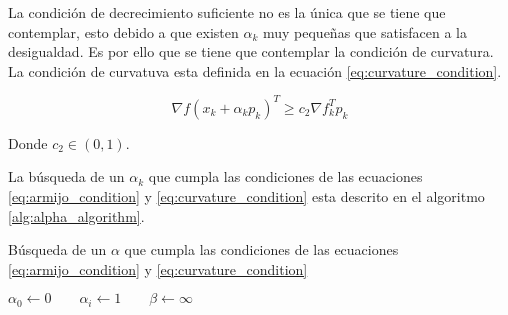 La condición de decrecimiento suficiente no es la única que se tiene que contemplar, esto debido a que existen $\alpha_k$ muy pequeñas que satisfacen a la desigualdad. Es por ello que se tiene que contemplar la condición de curvatura. La condición de curvatuva esta definida en la ecuación \ref{eq:curvature_condition}.

\begin{equation}
    \nabla f(x_k + \alpha_k p_k)^T  \geq c_2 \nabla f_k^T p_k  \label{eq:curvature_condition}
\end{equation}

Donde $c_2 \in (0,1)$.


La búsqueda de un $\alpha_k$ que cumpla las condiciones de las ecuaciones \ref{eq:armijo_condition} y \ref{eq:curvature_condition} esta descrito en el algoritmo \ref{alg:alpha_algorithm}.

\begin{algorithm}
    \caption{Búsqueda de un $\alpha$ que cumpla las condiciones de las ecuaciones \ref{eq:armijo_condition} y \ref{eq:curvature_condition} \label{alg:alpha_algorithm}}
    $\alpha_0 \gets 0 \qquad \alpha_i \gets 1 \qquad \beta \gets \infty$\\
\end{algorithm}





